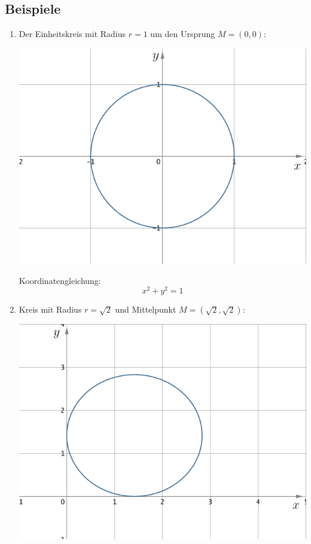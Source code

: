 \subsection{Beispiele}
\begin{enumerate}
    \item Der Einheitskreis mit Radius $r = 1$ um den Ursprung $M = (0 , 0)$:

\begin{center}
\includegraphics[scale=0.2]{img/kreis/kreis1.png}
\end{center}

Koordinatengleichung:
\[x^2 + y^2 = 1 \]

\item Kreis mit Radius $r = \sqrt 2$ und Mittelpunkt $M = (\sqrt 2 , \sqrt 2)$:

\begin{center}
\includegraphics[scale=0.2]{img/kreis/kreis2.png}
\end{center}


\end{enumerate}
